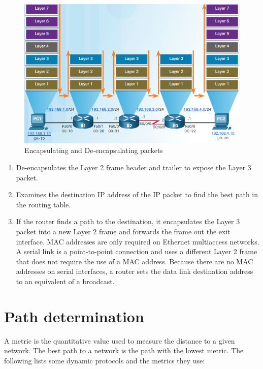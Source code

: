 \begin{figure}[hbtp]
\caption{Encapsulating and De-encapsulating packets}\label{SwitchingFunc}
\centering
\includegraphics[scale=0.7]{pictures/SwitchingFunc.PNG}
\end{figure}


\begin{enumerate}
\item De-encapsulates the Layer 2 frame header and trailer to expose the Layer 3 packet.

\item Examines the destination IP address of the IP packet to find the best path in the routing table.

\item If the router finds a path to the destination, it encapsulates the Layer 3 packet into a new Layer 2 frame and forwards the frame out the exit interface. MAC addresses are only required on Ethernet multiaccess networks. A serial link is a point-to-point connection and uses a different Layer 2 frame that does not require the use of a MAC address. Because there are no MAC addresses on serial interfaces, a router sets the data link destination address to an equivalent of a broadcast.
\end{enumerate}

\section{Path determination}

A metric is the quantitative value used to measure the distance to a given network. The best path to a network is the path with the lowest metric. The following lists some dynamic protocols and the metrics they use:

